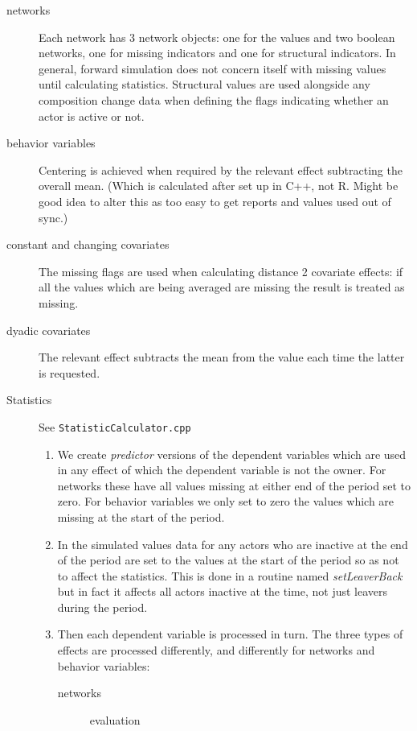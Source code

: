 \documentclass[12pt,a4paper]{article}
\renewcommand{\=}{\,=\,}
\newcommand{\+}{\,+\,}
\newcommand{\nnm}[1]{\textsf{\small\textit{#1}}}
\begin{document}
\begin{description}
\item[networks] Each network has 3 network objects: one for the values and two
  boolean networks, one for missing indicators and one for structural
  indicators. In general, forward simulation does not concern itself with
  missing values until calculating statistics. Structural values are used
  alongside any composition change data when defining the flags indicating
  whether an actor is active or not.
\item[behavior variables] Centering is achieved when required by the relevant
  effect subtracting the overall mean. (Which is calculated after set up in C++,
  not R. Might be good idea to alter this as too easy to get reports and values
  used out of sync.)
\item[constant and changing covariates] The missing
  flags are used when calculating distance 2 covariate effects: if all the
  values which are being averaged are missing the result is treated as missing.
\item[dyadic covariates] The relevant effect subtracts the mean from the value
  each time the latter is requested.
\item[Statistics] See \texttt{StatisticCalculator.cpp}\hfill
\begin{enumerate}
\item We create \emph{predictor} versions of the dependent variables which are
  used in any effect of which the dependent variable is not the owner. For
  networks these have all values missing at either end of the period set to
  zero. For behavior variables we only set to zero the values which are missing
  at the start of the period.
\item In the simulated values data for any actors who are inactive at the end of
  the period are set to the values at the start of the period so as not to
  affect the statistics. This is done in a routine named \nnm{setLeaverBack} but
  in fact it affects all actors inactive at the time, not just leavers during
  the period.
\item Then each dependent variable is processed in turn. The three types of
  effects are processed differently, and differently for networks and behavior
  variables:
  \begin{description}
  \item[networks]\hfill
    \begin{description}
    \item[evaluation]\hfill
      \begin{enumerate}

\end{enumerate}
\end{description}
\end{description}
\end{enumerate}
\end{description}
\end{document}
